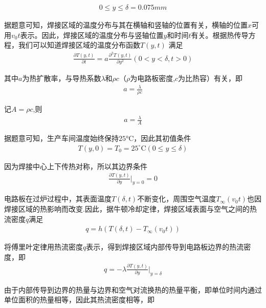 \documentclass[../main.tex]{subfiles}
\begin{document}
\begin{align}\label{1.21}
    0\le y\le \delta =0.075mm  
    \end{align}
    \par 据题意可知，焊接区域的温度分布与其在横轴和竖轴的位置有关，横轴的位置$x$可用$v_0t$表示。因此，焊接区域的温度分布与竖轴位置$y$和时间$t$有关。根据热传导方程，我们可以知道焊接区域的温度分布函数$T\left( y,t \right) $ 满足
    \begin{align}\label{1.19}
    \frac{\partial T(y,t)}{\partial t}=a\frac{\partial ^2T(y,t)}{\partial y^2}(0<y<\delta,t>0)
    \end{align}
    \par  其中$a$为热扩散率，与导热系数$\lambda$和$\rho c$（$\rho$为电路板密度,$c$为比热容）有关，即
    \begin{align}
    a=\frac{\lambda}{\rho c}
    \end{align}
    \par  记$A=\rho c$,则
    \begin{align}\label{2.2}
    a=\frac{\lambda}{A}
    \end{align}
    \par  据题意可知，生产车间温度始终保持$25°\text{C}$，因此其初值条件
    \begin{align}\label{2.3}
    T(y,0)=T_0=25^{\circ}\mathrm{C}(0\leqslant y\leqslant \delta)
    \end{align}  
    \par 因为焊接中心上下传热对称，所以其边界条件
    \begin{align}\label{2.4}
    \frac{\partial T(y,t)}{\partial y}\Big|_{y = 0}=0
    \end{align} 
    \par 电路板在过炉过程中，其表面温度$T\left( \delta ,t \right)$不断变化，周围空气温度$T_{\infty}(v_0t)$也因焊接区域的热影响而改变.因此，据牛顿冷却定律，焊接区域表面与空气之间的热流密度$q$满足
    \begin{align}\label{2.5}
    q = h(T(\delta,t) - T_{\infty}(v_0t))
    \end{align}
    \par 将傅里叶定律用热流密度$q$表示，得到焊接区域内部传导到电路板边界的热流密度，即
    \begin{align}\label{2.6}
    q= -\lambda\frac{\partial T(y,t)}{\partial y}\Big|_{y= \delta}    
    \end{align}
    \par 由于内部传导到边界的热量与边界和空气对流换热的热量平衡，即单位时间内通过单位面积的热量相等，因此其热流密度相等，即
\end{document}
